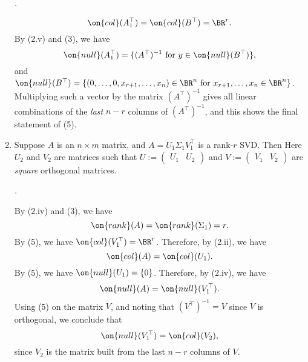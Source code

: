 \documentclass[10pt]{amsart}
\makeatletter
\renewenvironment{proof}[1][\proofname]{\par
	\pushQED{\qed}%
	\normalfont \topsep6\p@\@plus6\p@\relax
	\noindent\emph{#1.} 
	\ignorespaces
}{%
\popQED\endtrivlist\@endpefalse
}
\theoremstyle{mythm}
\theoremstyle{definition}
\theoremstyle{myrmk}
\newenvironment{myproof}{\color{blue}\begin{proof}}{\end{proof}}
\makeatother
\begin{document}
\begin{enumerate}[label=(\arabic*)]
\begin{myproof}
			\[
				\on{col}(A_1^\top) = \on{col}(B^\top) = \BR^r. 
			\]
			By (2.v) and (3), we have 
			\[
				\on{null}(A_1^\top) = \{(A^\top)^{-1} \text{ for } y \in \on{null}(B^\top)\}, 
			\]
			and $\on{null}(B^\top) = \{(0, \ldots, 0, x_{r+1}, \ldots, x_n) \in \BR^n \text{ for } x_{r+1}, \ldots, x_n \in \BR^n\}$. Multiplying such a vector by the matrix $(A^\top)^{-1}$ gives all linear combinations of the \emph{last} $n-r$ columns of $(A^\top)^{-1}$, and this shows the final statement of (5). 				
		\end{myproof}
		\item Suppose $A$ is an $n \times m$ matrix, and $A = U_1\Sigma_1 V_1^\top$ is a rank-$r$ SVD. Then 
		Here $U_2$ and $V_2$ are matrices such that $U := \left( \begin{array}{c|c} U_1 & U_2 \end{array} \right)$ and $V := \left( \begin{array}{c|c} V_1 & V_2 \end{array} \right)$ are \emph{square} orthogonal matrices. 
		\begin{myproof}
			By (2.iv) and (3), we have 
			\[
				\on{rank}(A) = \on{rank}(\Sigma_1) = r. 
			\]
			By (5), we have $\on{col}(V_1^\top) = \BR^r$. Therefore, by (2.ii), we have 
			\[
				\on{col}(A) = \on{col}(U_1). 
			\]
			By (5), we have $\on{null}(U_1) = \{0\}$. Therefore, by (2.iv), we have 
			\[
				\on{null}(A) = \on{null}(V_1^\top). 
			\]
			Using (5) on the matrix $V$, and noting that $(V^\top)^{-1} = V$ since $V$ is orthogonal, we conclude that 
			\[
				\on{null}(V_1^\top) = \on{col}(V_2), 
			\]
			since $V_2$ is the matrix built from the last $n-r$ columns of $V$. 
			

\end{myproof}
\end{enumerate}
\end{document}

